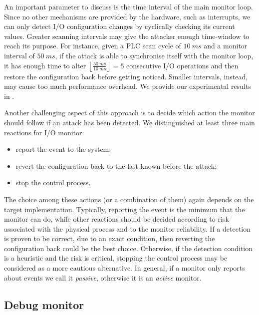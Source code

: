 An important parameter to discuss is the time interval of the main monitor loop. Since no other mechanisms are provided by the hardware,
such as interrupts, we can only detect I/O configuration changes by cyclically checking its current values. Greater scanning intervals may give the attacker
enough time-window to reach its purpose. For instance, given a PLC scan cycle of $\SI{10}{ms}$ and a monitor interval of $\SI{50}{ms}$,
if the attack is able to synchronise itself with the monitor loop, it has enough time to alter $\left \lfloor{\frac{\SI{50}{ms}}{\SI{10}{ms}}}\right \rfloor = 5$
consecutive I/O operations and then restore the configuration back before getting noticed. Smaller intervals, instead, may cause too much performance overhead.
We provide our experimental results in .

Another challenging aspect of this approach is to decide which action the monitor should follow if an attack has been detected.
We distinguished at least three main reactions for I/O monitor:
\begin{itemize}
	\item report the event to the system;
	\item revert the configuration back to the last known before the attack;
	\item stop the control process.
\end{itemize}
The choice among these actions (or a combination of them) again depends on the target implementation.
Typically, reporting the event is the minimum that the monitor can do, while other reactions should be decided according to risk associated with the physical process
and to the monitor reliability. If a detection is proven to be correct, due to an exact condition,
then reverting the configuration back could be the best choice. Otherwise, if the detection condition is a heuristic and the risk is critical,
stopping the control process may be considered as a more cautious alternative.
In general, if a monitor only reports about events we call it \emph{passive}, otherwise it is an \emph{active} monitor.


\subsection{Debug monitor}
\label{sec:dr-design}

